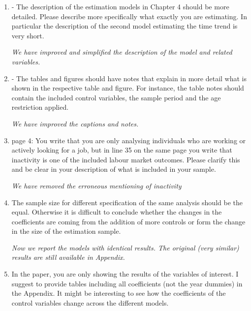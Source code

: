 \documentclass{article}
\newenvironment{response}
{\slshape}{}
\begin{document}
\begin{enumerate}
\item- The description of the estimation models in Chapter 4 should
  be more detailed. Please describe more specifically what exactly you
  are estimating. In particular the description of the second model
  estimating the time trend is very short.

  \begin{response}
    We have improved and simplified the description of the model and related variables.
  \end{response}
\item - The tables and figures should have notes that explain in more
  detail what is shown in the respective table and figure. For
  instance, the table notes should contain the included control
  variables, the sample period and the age restriction applied.

  \begin{response}
    We have improved the captions and notes.
  \end{response}

\item page 4: You write that you are only analysing individuals who are
working or actively looking for a job, but in line 35 on the same page
you write that inactivity is one of the included labour market
outcomes. Please clarify this and be clear in your description of what
is included in your sample.

\begin{response}
  We have removed the erroneous mentioning of inactivity 
\end{response}
\item  The sample size for different specification of the same analysis
  should be the equal. Otherwise it is difficult to conclude whether the
  changes in the coefficients are coming from the addition of more
  controls or form the change in the size of the estimation sample.

  \begin{response}
    Now we report the models with identical results.  The original
    (very similar)
    results are still available in Appendix.
  \end{response}

\item In the paper, you are only showing the results of the variables of
  interest. I suggest to provide tables including all coefficients (not
  the year dummies) in the Appendix. It might be interesting to see how
  the coefficients of the control variables change across the different
  models.


\end{enumerate}
\end{document}
